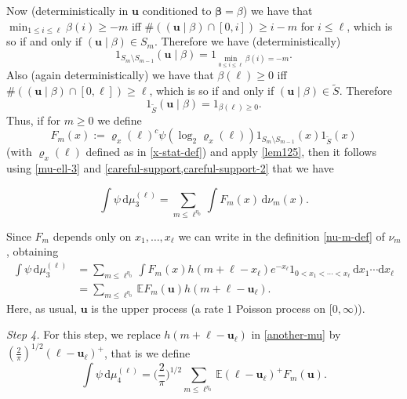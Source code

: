 \documentclass[11pt,reqno]{amsart}
\numberwithin{equation}{section}
\theoremstyle{definition}
\theoremstyle{remark}
\newcommand{\mb}{\mathbb}
\newcommand{\mbf}{\mathbf}
\def\boldbeta{\boldsymbol\beta}
\renewcommand{\le}{\leqslant}
\renewcommand{\ge}{\geqslant}
\begin{document}
Now (deterministically in $\mbf{u}$ conditioned to $\boldbeta = \beta$) we have that $\min_{1 \le i \le \ell} \beta(i) \ge -m$ iff $\# ((\mbf{u} \mid \beta) \cap [0,i]) \ge i - m$ for $i \le \ell$, which is so if and only if $(\mbf{u} \mid \beta) \in S_{m}$. Therefore we have (deterministically) \begin{equation}\label{careful-support} 1_{S_{m} \setminus S_{m - 1}}(\mbf{u} \mid \beta) = 1_{\min_{0 \le i \le \ell} \beta(i) = -m}.\end{equation} 
Also (again deterministically) we have that $\beta(\ell) \ge 0$ iff $\# ((\mbf{u} \mid \beta) \cap [0, \ell]) \ge \ell$, which is so if and only if $(\mbf{u} \mid \beta) \in \tilde S$. Therefore
\begin{equation}\label{careful-support-2} 1_{\tilde S}(\mbf{u} \mid \beta) = 1_{\beta(\ell) \ge 0}.\end{equation} 
Thus, if for $m \ge 0$ we define
\begin{equation}\label{fm-defn} F_m(x) := \varrho_x(\ell)^c \psi (\log_2 \varrho_x(\ell))1_{S_{m} \setminus S_{m - 1}}(x)1_{\tilde S}(x)\end{equation} (with $\varrho_x(\ell)$ defined as in \cref{x-stat-def}) and apply \cref{lem125}, then it follows using \cref{mu-ell-3} and \cref{careful-support,careful-support-2} that we have

\[ \int \psi \, \mathrm{d} \mu_3^{(\ell)} = \sum_{m \le \ell^{\eta_0}}\int F_m(x)  \, \mathrm{d}\nu_m(x).\]

Since $F_m$ depends only on $x_1,\dots, x_{\ell}$ we can write in the definition \cref{nu-m-def} of $\nu_m$, obtaining
\begin{align} \nonumber \int \psi \, \mathrm{d} \mu_3^{(\ell)} & = \sum_{m \le \ell^{\eta_0}}\int F_m(x) h(m + \ell - x_{\ell}) e^{-x_{\ell}} 1_{0 < x_1 < \cdots < x_{\ell}}   \, \mathrm{d}x_1 \cdots \mathrm{d}x_{\ell} \\ & = \sum_{m \le \ell^{\eta_0}} \mb{E} F_m(\mbf{u}) h(m + \ell - \mbf{u}_{\ell}).\label{another-mu}\end{align}
Here, as usual, $\mbf{u}$ is the upper process (a rate $1$ Poisson process on $[0,\infty)$).\vspace*{10pt}

\emph{Step 4.} For this step, we replace $h(m + \ell - \mbf{u}_{\ell})$ in \cref{another-mu} by $(\frac{2}{\pi})^{1/2} (\ell - \mbf{u}_{\ell})^+$, that is we define
\begin{equation}\label{mu-ell-4} \int \psi \, \mathrm{d} \mu_4^{(\ell)} = \big(\frac{2}{\pi}\big)^{1/2}\sum_{m \le \ell^{\eta_0}}\mb{E} (\ell - \mbf{u}_{\ell})^+ F_m(\mbf{u})  .\end{equation}
\end{document}
